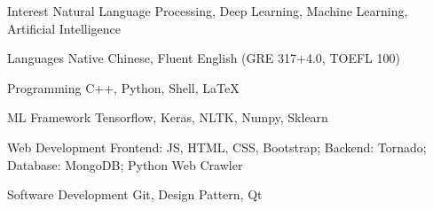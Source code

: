 

\begin{cvskills}


  \cvskill
    {Interest} %
    {Natural Language Processing, Deep Learning, Machine Learning, Artificial Intelligence} %

    

  \cvskill
    {Languages} %
    {Native Chinese, Fluent English (GRE 317+4.0, TOEFL 100)} %


  \cvskill
    {Programming} %
    {C++, Python, Shell, LaTeX} %

  \cvskill
    {ML Framework} %
    {Tensorflow, Keras, NLTK, Numpy, Sklearn} %

  \cvskill
    {Web Development} %
    {Frontend: JS, HTML, CSS, Bootstrap; Backend: Tornado; Database: MongoDB; Python Web Crawler} %

  \cvskill
    {Software Development} %
    {Git, Design Pattern, Qt} %

\end{cvskills}
